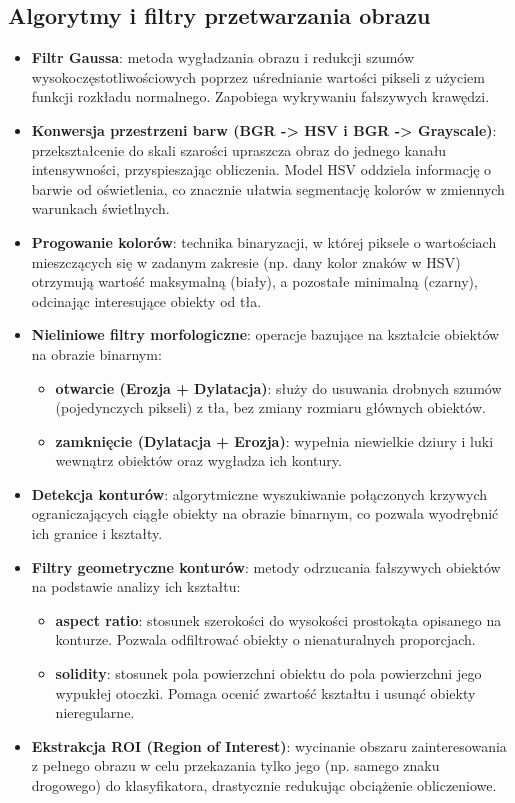 \documentclass[12pt,oneside]{article}
\begin{document}
\subsection{Algorytmy i filtry przetwarzania obrazu}
\begin{itemize}
    \item \textbf{Filtr Gaussa}: metoda wygładzania obrazu i redukcji szumów wysokoczęstotliwościowych poprzez uśrednianie wartości pikseli z użyciem funkcji rozkładu normalnego. Zapobiega wykrywaniu fałszywych krawędzi.
    \item \textbf{Konwersja przestrzeni barw (BGR -> HSV i BGR -> Grayscale)}: przekształcenie do skali szarości upraszcza obraz do jednego kanału intensywności, przyspieszając obliczenia. Model HSV oddziela informację o barwie od oświetlenia, co znacznie ułatwia segmentację kolorów w zmiennych warunkach świetlnych.
    \item \textbf{Progowanie kolorów}: technika binaryzacji, w której piksele o wartościach mieszczących się w zadanym zakresie (np. dany kolor znaków w HSV) otrzymują wartość maksymalną (biały), a pozostałe minimalną (czarny), odcinając interesujące obiekty od tła.
    \item \textbf{Nieliniowe filtry morfologiczne}: operacje bazujące na kształcie obiektów na obrazie binarnym:
        \begin{itemize}
            \item \textbf{otwarcie (Erozja + Dylatacja)}: służy do usuwania drobnych szumów (pojedynczych pikseli) z tła, bez zmiany rozmiaru głównych obiektów.
            \item \textbf{zamknięcie (Dylatacja + Erozja)}: wypełnia niewielkie dziury i luki wewnątrz obiektów oraz wygładza ich kontury.
        \end{itemize}
    \item \textbf{Detekcja konturów}: algorytmiczne wyszukiwanie połączonych krzywych ograniczających ciągłe obiekty na obrazie binarnym, co pozwala wyodrębnić ich granice i kształty.
    \item \textbf{Filtry geometryczne konturów}: metody odrzucania fałszywych obiektów na podstawie analizy ich kształtu:
        \begin{itemize}
            \item \textbf{aspect ratio}: stosunek szerokości do wysokości prostokąta opisanego na konturze. Pozwala odfiltrować obiekty o nienaturalnych proporcjach.
            \item \textbf{solidity}: stosunek pola powierzchni obiektu do pola powierzchni jego wypukłej otoczki. Pomaga ocenić zwartość kształtu i usunąć obiekty nieregularne.
        \end{itemize}
    \item \textbf{Ekstrakcja ROI (Region of Interest)}: wycinanie obszaru zainteresowania z pełnego obrazu w celu przekazania tylko jego (np. samego znaku drogowego) do klasyfikatora, drastycznie redukując obciążenie obliczeniowe.
\end{itemize}
\end{document}
